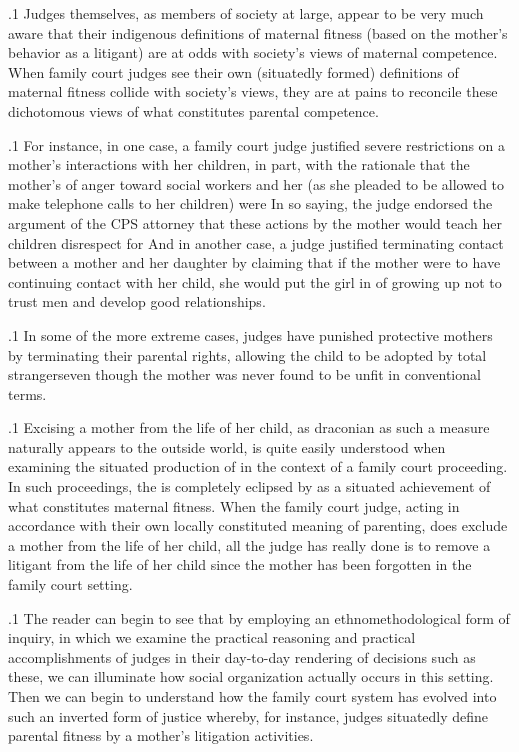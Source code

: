 \documentclass[11pt, twoside]{article}
\begin{document}
{\p.1{%
Judges themselves, as members of society at large, appear to be very
much aware that their indigenous definitions of maternal fitness (based
on the mother’s behavior as a litigant) are at odds with society’s views
of maternal competence. When family court judges see their own (situatedly formed) definitions of maternal fitness collide with society’s
views, they are at pains to reconcile these dichotomous views of what
constitutes parental competence.
}%

\p.1{%
For instance, in one case, a family court judge justified severe restrictions on a mother’s interactions with her children, in part, with the
rationale that the mother’s  of anger toward social
workers and her  (as she pleaded
to be allowed to make telephone calls to her children) were  In so saying, the judge endorsed the argument of the CPS attorney that these actions by the mother would
teach her children disrespect for  And in another case, a
judge justified terminating contact between a mother and her daughter by claiming that if the mother were to have continuing contact with
her child, she would put the girl in  of growing up not to trust
men and develop good relationships.
}%

\p.1{%
In some of the more extreme cases, judges have punished protective
mothers by terminating their parental rights, allowing the child to
be adopted by total strangers\mdash{}even though the mother was never found
to be unfit in conventional terms.
}%

\p.1{%
Excising a mother from the life of her child, as draconian as such a
measure naturally appears to the outside world, is quite easily understood when examining the situated production of 
in the context of a family court proceeding. In such proceedings, the
 is completely eclipsed by  as
a situated achievement of what constitutes maternal fitness. When the
family court judge, acting in accordance with their own locally constituted meaning of  parenting, does exclude a mother from the life
of her child, all the judge has really done is to remove a  litigant from the life of her child since the  mother has been
forgotten in the family court setting.
}%

\p.1{%
The reader can begin to see that by employing an ethnomethodological form of inquiry, in which we examine the practical reasoning and
practical accomplishments of judges in their day-to-day rendering of
decisions such as these, we can illuminate how social organization actually occurs in this setting. Then we can begin to understand how
the family court system has evolved into such an inverted form of justice whereby, for instance, judges situatedly define parental fitness by a
mother’s litigation activities.
}%

}
\end{document}
